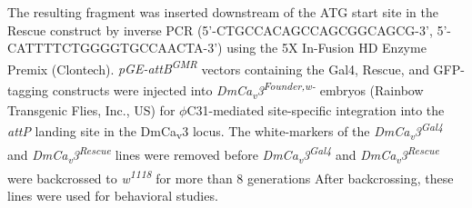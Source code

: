 The resulting fragment was inserted downstream of the ATG start site in the Rescue construct by inverse PCR (5'-CTGCCACAGCCAGCGGCAGCG-3', 5'-CATTTTCTGGGGTGCCAACTA-3') using the 5X In-Fusion HD Enzyme Premix (Clontech).       
\emph{pGE-attB\textsuperscript{GMR}} vectors containing the Gal4, Rescue, and GFP-tagging constructs were injected into \emph{DmCa\textsubscript{v}3\textsuperscript{Founder,w-}} embryos (Rainbow Transgenic Flies, Inc., US) for $\phi$C31-mediated site-specific integration into the \emph{attP} landing site in the DmCa\textsubscript{v}3 locus.
The white-markers of the \emph{DmCa\textsubscript{v}3\textsuperscript{Gal4}} and \emph{DmCa\textsubscript{v}3\textsuperscript{Rescue}} lines were removed before \emph{DmCa\textsubscript{v}3\textsuperscript{Gal4}} and \emph{DmCa\textsubscript{v}3\textsuperscript{Rescue}} were backcrossed to \emph{w\textsuperscript{1118}} for more than 8 generations
After backcrossing, these lines were used for behavioral studies.
